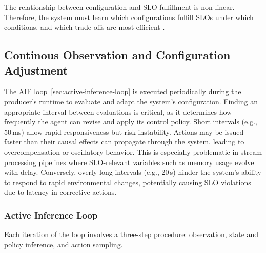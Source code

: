 The relationship between configuration and SLO fulfillment is non-linear. Therefore, the system must learn which configurations fulfill SLOs under which conditions, and which trade-offs are most efficient \cite{sedlak_towards_2025}.

\subsection{Continous Observation and Configuration Adjustment}
The AIF loop~\ref{sec:active-inference-loop} is executed periodically during the producer's runtime to evaluate and adapt the system's configuration. Finding an appropriate interval between evaluations is critical, as it determines how frequently the agent can revise and apply its control policy. Short intervals (e.g., 50\,ms) allow rapid responsiveness but risk instability. Actions may be issued faster than their causal effects can propagate through the system, leading to overcompensation or oscillatory behavior. This is especially problematic in stream processing pipelines where SLO-relevant variables such as memory usage evolve with delay. Conversely, overly long intervals (e.g., 20\,s) hinder the system’s ability to respond to rapid environmental changes, potentially causing SLO violations due to latency in corrective actions. 


\subsubsection{Active Inference Loop}
Each iteration of the loop involves a three-step procedure: observation, state and policy inference, and action sampling.

